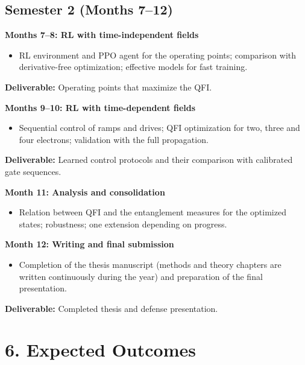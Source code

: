 \documentclass[12pt,a4paper]{article}
\begin{document}
\subsection*{Semester 2 (Months 7--12)}

\textbf{Months 7--8: RL with time-independent fields}
\begin{itemize}
    \item RL environment and PPO agent for the operating points;
    comparison with derivative-free optimization; effective models
    for fast training.
\end{itemize}
\textbf{Deliverable:} Operating points that maximize the QFI.

\bigskip

\textbf{Months 9--10: RL with time-dependent fields}
\begin{itemize}
    \item Sequential control of ramps and drives; QFI optimization
    for two, three and four electrons; validation with the full
    propagation.
\end{itemize}
\textbf{Deliverable:} Learned control protocols and their comparison
with calibrated gate sequences.

\bigskip

\textbf{Month 11: Analysis and consolidation}
\begin{itemize}
    \item Relation between QFI and the entanglement measures for the
    optimized states; robustness; one extension depending on
    progress.
\end{itemize}

\bigskip

\textbf{Month 12: Writing and final submission}
\begin{itemize}
    \item Completion of the thesis manuscript (methods and theory
    chapters are written continuously during the year) and
    preparation of the final presentation.
\end{itemize}
\textbf{Deliverable:} Completed thesis and defense presentation.

\section*{6. Expected Outcomes}
\end{document}
